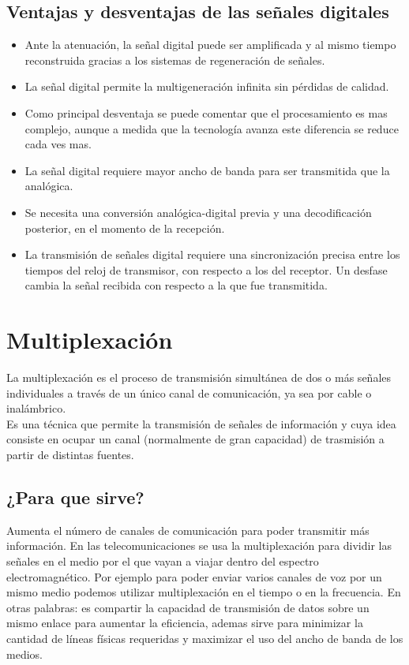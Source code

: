 \documentclass[11pt,fleqn]{book} %
\begin{document}
\subsection{Ventajas y desventajas de las señales digitales}
\begin{itemize}
\item Ante la atenuación, la señal digital puede ser amplificada y al mismo tiempo reconstruida gracias a los sistemas de regeneración de señales. 
\item La señal digital permite la multigeneración infinita sin pérdidas de calidad.
\item Como principal desventaja se puede comentar que el procesamiento es mas complejo, aunque a medida que la tecnología avanza este diferencia se reduce cada ves mas.
\item La señal digital requiere mayor ancho de banda para ser transmitida que la analógica. 
\item Se necesita una conversión analógica-digital previa y una decodificación posterior, en el momento de la recepción. 
\item La transmisión de señales digital requiere una sincronización precisa entre los tiempos del reloj de transmisor, con respecto a los del receptor. Un desfase cambia la señal recibida con respecto a la que fue transmitida.
\end{itemize}
\section{Multiplexación}
La multiplexación es el proceso de transmisión simultánea de dos o más señales individuales a través de un único canal de comunicación, ya sea por cable o inalámbrico.\\
Es una técnica que permite la transmisión de señales de información y cuya idea consiste en ocupar un canal (normalmente de gran capacidad) de trasmisión a partir de distintas fuentes.
\subsection{¿Para que sirve?}
Aumenta el número de canales de comunicación para poder transmitir más información. En las telecomunicaciones se usa la multiplexación para dividir las señales en el medio por el que vayan a viajar dentro del espectro electromagnético. Por ejemplo para poder enviar varios canales de voz por un mismo medio podemos utilizar multiplexación en el tiempo o en la frecuencia. En otras palabras: es compartir la capacidad de transmisión de datos sobre un mismo enlace para aumentar la eficiencia, ademas sirve para minimizar la cantidad de líneas físicas requeridas y maximizar el uso del ancho de banda de los medios.
\end{document}
